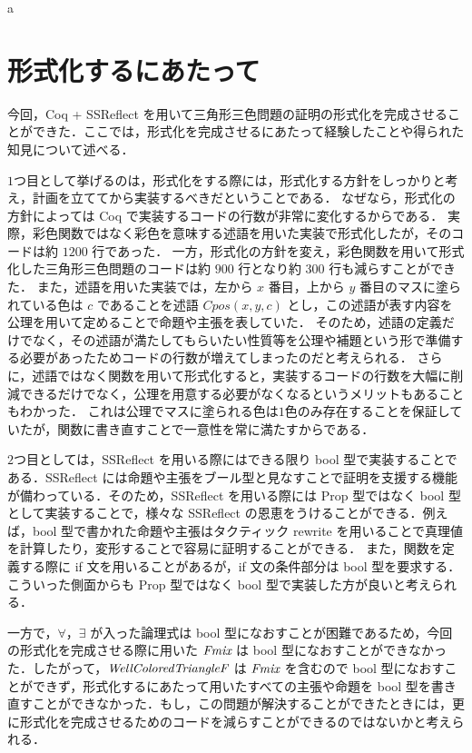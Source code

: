 \newpage
a
\newpage
\section{形式化するにあたって}
今回，Coq + SSReflect を用いて三角形三色問題の証明の形式化を完成させることができた．ここでは，形式化を完成させるにあたって経験したことや得られた知見について述べる．

$1$つ目として挙げるのは，形式化をする際には，形式化する方針をしっかりと考え，計画を立ててから実装するべきだということである．
なぜなら，形式化の方針によっては Coq で実装するコードの行数が非常に変化するからである．
実際，彩色関数ではなく彩色を意味する述語を用いた実装で形式化したが，そのコードは約 $1200$ 行であった．
一方，形式化の方針を変え，彩色関数を用いて形式化した三角形三色問題のコードは約 $900$ 行となり約 $300$ 行も減らすことができた．
また，述語を用いた実装では，左から $x$ 番目，上から $y$ 番目のマスに塗られている色は $c$ であることを述語 $Cpos(x,y,c)$ とし，この述語が表す内容を公理を用いて定めることで命題や主張を表していた．
そのため，述語の定義だけでなく，その述語が満たしてもらいたい性質等を公理や補題という形で準備する必要があったためコードの行数が増えてしまったのだと考えられる．
さらに，述語ではなく関数を用いて形式化すると，実装するコードの行数を大幅に削減できるだけでなく，公理を用意する必要がなくなるというメリットもあることもわかった．
これは公理でマスに塗られる色は$1$色のみ存在することを保証していたが，関数に書き直すことで一意性を常に満たすからである．

$2$つ目としては，SSReflect を用いる際にはできる限り bool 型で実装することである．SSReflect には命題や主張をブール型と見なすことで証明を支援する機能が備わっている．そのため，SSReflect を用いる際には Prop 型ではなく bool 型として実装することで，様々な SSReflect の恩恵をうけることができる．例えば，bool 型で書かれた命題や主張はタクティック rewrite を用いることで真理値を計算したり，変形することで容易に証明することができる．
また，関数を定義する際に if 文を用いることがあるが，if 文の条件部分は bool 型を要求する．こういった側面からも Prop 型ではなく bool 型で実装した方が良いと考えられる．

一方で，$\forall$，$\exists$ が入った論理式は bool 型になおすことが困難であるため，今回の形式化を完成させる際に用いた $\textit{Fmix}$ は bool 型になおすことができなかった．したがって，$\textit{WellColoredTriangleF}$ は $\textit{Fmix}$ を含むので bool 型になおすことができず，形式化するにあたって用いたすべての主張や命題を bool 型を書き直すことができなかった．もし，この問題が解決することができたときには，更に形式化を完成させるためのコードを減らすことができるのではないかと考えられる．

